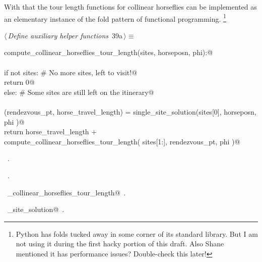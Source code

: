 \documentclass[11.5pt]{report}
\begin{document}
\vspace{-0.8cm}
With that the tour length functions for collinear horseflies can be implemented as 
an elementary instance of the fold pattern of functional programming. 
\footnote{Python has folds tucked away in some corner of its standard library. 
But I am not using it during the first hacky portion of this draft. Also Shane 
mentioned it has performance issues? Double-check this later!}


\begin{flushleft} \small\label{scrap52}\raggedright\small
{} $\langle\,${\itshape Define auxiliary helper functions}\nobreak\ {\footnotesize {39a}}$\,\rangle\equiv$
\vspace{-1ex}
\begin{list}{}{} \item
\mbox{}\verb@def compute_collinear_horseflies_tour_length(sites, horseposn, phi):@\\
\mbox{}\verb@@\\
\mbox{}\verb@     if not sites: # No more sites, left to visit!@\\
\mbox{}\verb@          return 0@\\
\mbox{}\verb@     else:         # Some sites are still left on the itinerary@\\
\mbox{}\verb@@\\
\mbox{}\verb@          (rendezvous_pt, horse_travel_length) = single_site_solution(sites[0], horseposn, phi )@\\
\mbox{}\verb@          return horse_travel_length  + \@\\
\mbox{}\verb@                 compute_collinear_horseflies_tour_length( sites[1:], rendezvous_pt, phi )@\\
\mbox{}\verb@@{\NWsep}
\end{list}
\vspace{-1.5ex}
\footnotesize
\begin{list}{}{\setlength{\itemsep}{-\parsep}\setlength{\itemindent}{-\leftmargin}}
\item \NWtxtMacroDefBy\ .
\item \NWtxtMacroRefIn\ .
\item \NWtxtIdentsDefed\nobreak\  \verb@compute_collinear_horseflies_tour_length@\nobreak\ .\item \NWtxtIdentsUsed\nobreak\  \verb@single_site_solution@\nobreak\ .
\item{}
\end{list}
\vspace{4ex}
\end{flushleft}
\end{document}
